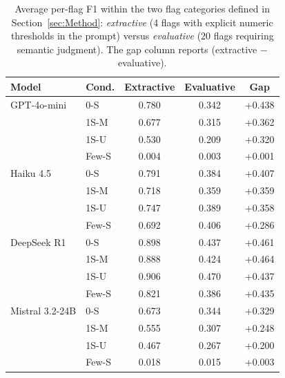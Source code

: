 \begin{table}[!htbp]
\centering
\caption{Average per-flag F1 within the two flag categories defined in
Section~\ref{sec:Method}: \emph{extractive} (4 flags with explicit
numeric thresholds in the prompt) versus \emph{evaluative} (20 flags
requiring semantic judgment). The gap column reports
(extractive $-$ evaluative).}
\label{tab:extractive-evaluative}
\small
\begin{tabular}{llccc}
\toprule
Model & Cond. & Extractive & Evaluative & Gap \\
\midrule
GPT-4o-mini & 0-S & 0.780 & 0.342 & +0.438 \\
 & 1S-M & 0.677 & 0.315 & +0.362 \\
 & 1S-U & 0.530 & 0.209 & +0.320 \\
 & Few-S & 0.004 & 0.003 & +0.001 \\
Haiku 4.5 & 0-S & 0.791 & 0.384 & +0.407 \\
 & 1S-M & 0.718 & 0.359 & +0.359 \\
 & 1S-U & 0.747 & 0.389 & +0.358 \\
 & Few-S & 0.692 & 0.406 & +0.286 \\
DeepSeek R1 & 0-S & 0.898 & 0.437 & +0.461 \\
 & 1S-M & 0.888 & 0.424 & +0.464 \\
 & 1S-U & 0.906 & 0.470 & +0.437 \\
 & Few-S & 0.821 & 0.386 & +0.435 \\
Mistral 3.2-24B & 0-S & 0.673 & 0.344 & +0.329 \\
 & 1S-M & 0.555 & 0.307 & +0.248 \\
 & 1S-U & 0.467 & 0.267 & +0.200 \\
 & Few-S & 0.018 & 0.015 & +0.003 \\
\bottomrule
\end{tabular}
\end{table}
